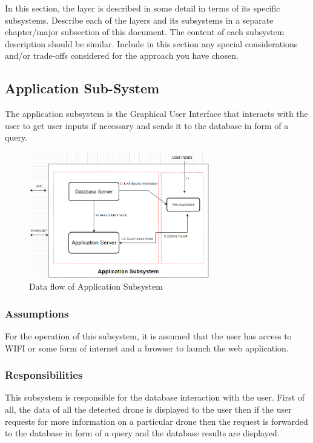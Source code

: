 In this section, the layer is described in some detail in terms of its specific subsystems. Describe each of the layers and its subsystems in a separate chapter/major subsection of this document. The content of each subsystem description should be similar. Include in this section any special considerations and/or trade-offs considered for the approach you have chosen.

\subsection{Application Sub-System}
The application subsystem is the Graphical User Interface that interacts with the user to get user inputs if necessary and sends it to the database in form of a query.

\begin{figure}[h!]
	\centering
 	\includegraphics[width=0.70\textwidth]{images/Application_Subsystem.png}
 \caption{Data flow of Application Subsystem}
\end{figure}

\subsubsection{Assumptions}
For the operation of this subsystem, it is assumed that the user has access to WIFI or some form of internet and a browser to launch the web application.

\subsubsection{Responsibilities}
This subsystem is responsible for the database interaction with the user. First of all, the data of all the detected drone is displayed to the user then if the user requests for more information on a particular drone then the request is forwarded to the database in form of a query and the database results are displayed. 

